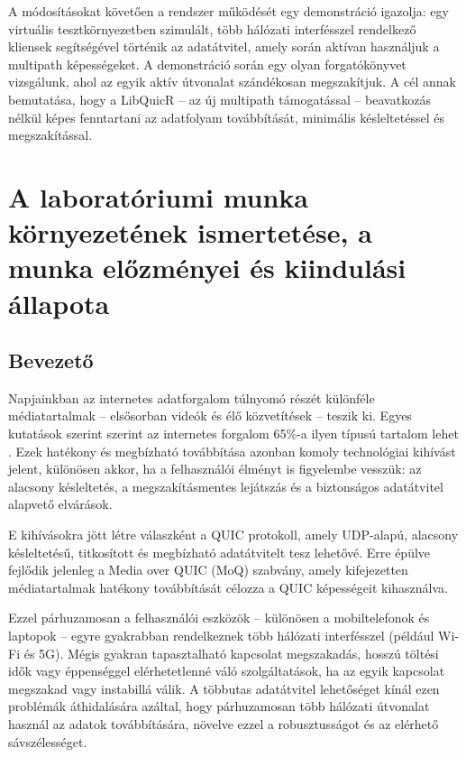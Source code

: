 \documentclass[a4paper,oneside]{article}
\begin{document}
\begin{titlepage}
{  A módosításokat követően a rendszer működését egy demonstráció
  igazolja: egy virtuális tesztkörnyezetben szimulált, több hálózati 
  interfésszel rendelkező kliensek segítségével történik az adatátvitel, 
  amely során aktívan használjuk a multipath képességeket. A demonstráció 
  során egy olyan forgatókönyvet vizsgálunk, ahol az egyik aktív 
  útvonalat szándékosan megszakítjuk. 
  A cél annak bemutatása, hogy a LibQuicR – az új multipath támogatással – 
  beavatkozás nélkül képes fenntartani az adatfolyam 
  továbbítását, minimális késleltetéssel és megszakítással.}

 
  
 
\end{titlepage} 

\section{A laboratóriumi munka környezetének ismertetése,
     a munka előzményei és kiindulási állapota}
\label{sec:kornyezet}
\subsection{Bevezető}
\label{sec:bevezeto}
Napjainkban az internetes adatforgalom túlnyomó részét különféle médiatartalmak – 
elsősorban videók és élő közvetítések – teszik ki. Egyes kutatások szerint 
szerint az internetes forgalom 65\%-a ilyen típusú tartalom lehet \cite{live_stats}. 
Ezek hatékony és megbízható továbbítása azonban komoly 
technológiai kihívást jelent, különösen akkor, ha a felhasználói élményt is 
figyelembe vesszük: az alacsony késleltetés, a megszakításmentes lejátszás 
és a biztonságos adatátvitel alapvető elvárások.

E kihívásokra jött létre válaszként a QUIC protokoll, amely UDP-alapú, alacsony 
késleltetésű, titkosított és megbízható adatátvitelt tesz lehetővé. Erre épülve 
fejlődik jelenleg a Media over QUIC (MoQ) szabvány, amely kifejezetten 
médiatartalmak hatékony továbbítását célozza a QUIC képességeit kihasználva.

Ezzel párhuzamosan a felhasználói eszközök – különösen a mobiltelefonok és 
laptopok – egyre gyakrabban rendelkeznek több hálózati interfésszel (például Wi-Fi és 5G). 
Mégis gyakran tapasztalható kapcsolat megszakadás, hosszú töltési idők vagy éppenséggel 
elérhetetlenné váló szolgáltatások, ha az egyik kapcsolat megszakad vagy instabillá 
válik. A többutas adatátvitel lehetőséget kínál ezen problémák áthidalására azáltal, 
hogy párhuzamosan több hálózati útvonalat használ az adatok továbbítására, növelve 
ezzel a robusztusságot és az elérhető sávszélességet.
\end{document}
